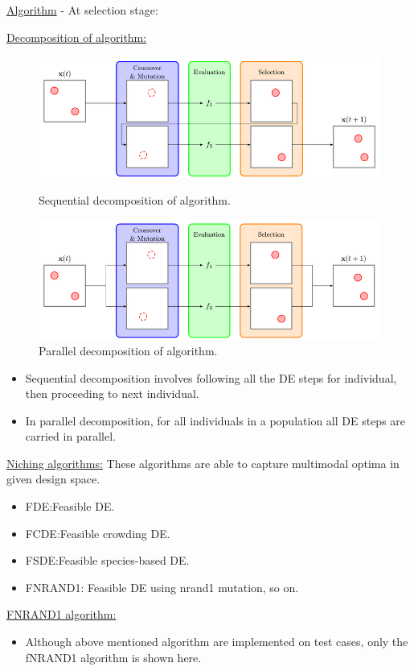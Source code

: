 \begin{frame}[allowframebreaks]{\underline{Algorithm} -}
At selection stage:

\newpage
\underline{Decomposition of algorithm:}
\begin{figure}
\parbox{0.47\linewidth}{
    
    \includegraphics[scale = 0.16]{figures/sequential_form_DE.png}
    \caption{Sequential decomposition of algorithm\cite{Poole2}.}
    \label{sequential_form_algo}
    }
    \parbox{0.47\linewidth}{
    
    \includegraphics[scale = 0.16]{figures/parallel_form_DE.png}
    \caption{Parallel decomposition of algorithm\cite{Poole2}.}
    \label{parallel_form_algo}
    }
\end{figure}
\begin{itemize}
\item Sequential decomposition involves following all the DE steps for individual, then proceeding to next individual.
\item In parallel decomposition, for all individuals in a population all DE steps are carried in parallel.
\end{itemize}
 \vspace{1mm}
\underline{Niching algorithms:} These algorithms are able to capture multimodal optima in given design space. 
\begin{itemize}
    \item FDE:Feasible DE.
    \item FCDE:Feasible crowding DE.
    \item FSDE:Feasible species-based DE.
    \item FNRAND1: Feasible DE using nrand1 mutation, so on.
\end{itemize}
\newpage
\underline{FNRAND1 algorithm:}
\begin{itemize}
\item Although above mentioned algorithm are implemented on test cases, only the fNRAND1 algorithm is shown here.
\end{itemize}


\end{frame}
